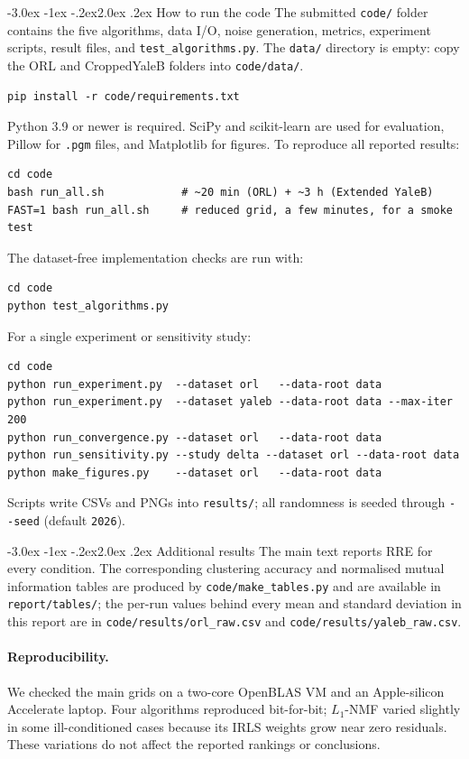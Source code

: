 \documentclass[12pt,a4paper]{article}
\makeatletter
\renewcommand\section{\@startsection{section}{1}{\z@}%
    {-3.0ex \@plus -1ex \@minus -.2ex}{2.0ex \@plus.2ex}%
    {\normalfont\fontsize{13}{15}\bfseries}}
\makeatother
\begin{document}
\section{How to run the code}
\label{sec:howtorun}
The submitted \texttt{code/} folder contains the five algorithms, data I/O,
noise generation, metrics, experiment scripts, result files, and
\texttt{test\_algorithms.py}. The \texttt{data/} directory is empty: copy
the ORL and CroppedYaleB folders into \texttt{code/data/}.
\begin{verbatim}
pip install -r code/requirements.txt
\end{verbatim}
Python 3.9 or newer is required. SciPy and scikit-learn are used for
evaluation, Pillow for \texttt{.pgm} files, and Matplotlib for figures.
To reproduce all reported results:
\begin{verbatim}
cd code
bash run_all.sh            # ~20 min (ORL) + ~3 h (Extended YaleB)
FAST=1 bash run_all.sh     # reduced grid, a few minutes, for a smoke test
\end{verbatim}
The dataset-free implementation checks are run with:
\begin{verbatim}
cd code
python test_algorithms.py
\end{verbatim}
For a single experiment or sensitivity study:
\begin{verbatim}
cd code
python run_experiment.py  --dataset orl   --data-root data
python run_experiment.py  --dataset yaleb --data-root data --max-iter 200
python run_convergence.py --dataset orl   --data-root data
python run_sensitivity.py --study delta --dataset orl --data-root data
python make_figures.py    --dataset orl   --data-root data
\end{verbatim}
Scripts write CSVs and PNGs into \texttt{results/}; all randomness is seeded
through \texttt{-{}-seed} (default \texttt{2026}).

\scriptsize
\section{Additional results}
The main text reports RRE for every condition. The corresponding clustering
accuracy and normalised mutual information tables are produced by
\texttt{code/make\_tables.py} and are available in
\texttt{report/tables/}; the per-run values behind every mean and standard
deviation in this report are in \texttt{code/results/orl\_raw.csv} and
\texttt{code/results/yaleb\_raw.csv}.

\paragraph{Reproducibility.} We checked the main grids on a two-core
OpenBLAS VM and an Apple-silicon Accelerate laptop. Four algorithms reproduced
bit-for-bit; $L_1$-NMF varied slightly in some ill-conditioned cases because
its IRLS weights grow near zero residuals. These variations do not affect the
reported rankings or conclusions.
\end{document}
